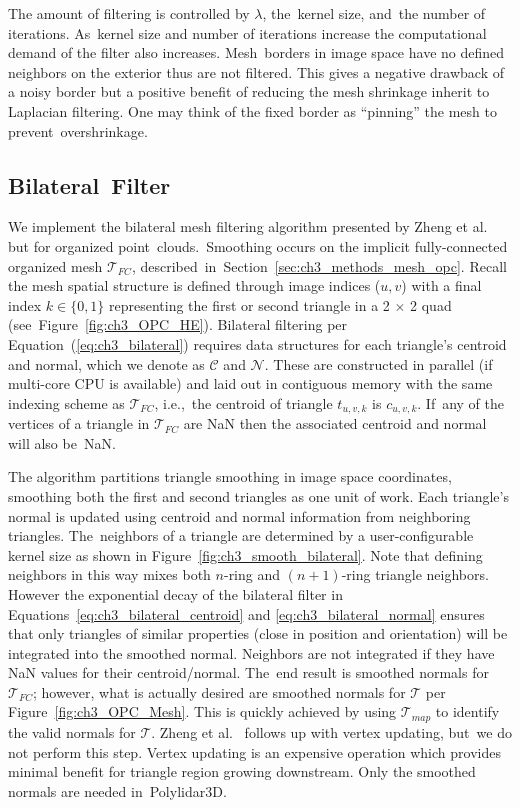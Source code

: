 The amount of filtering is controlled by $\lambda$, the~kernel size, and~the number of iterations. As~kernel size and number of iterations increase the computational demand of the filter also increases. Mesh~borders in image space have no defined neighbors on the exterior thus are not filtered. This gives a negative drawback of a noisy border but a positive benefit of reducing the mesh shrinkage inherit to Laplacian filtering. One may think of the fixed border as ``pinning'' the mesh to prevent~overshrinkage. 


\subsection{Bilateral~Filter}\label{sec:ch3_methods_mesh_smoothing_bilateral}

We implement the bilateral mesh filtering algorithm presented by Zheng et al.~\cite{zheng_bilateral_2011} but for organized point~clouds.~Smoothing occurs on the implicit fully-connected organized mesh $\mathcal{T}_{FC}$, described~in~Section~\ref{sec:ch3_methods_mesh_opc}.  Recall the mesh spatial structure is defined through image indices ($u,v$) with a final index $k \in \{0,1\}$ representing the first or second triangle in a 2 $\times$ 2 quad (see~Figure~\ref{fig:ch3_OPC_HE}). Bilateral filtering per Equation~(\ref{eq:ch3_bilateral}) requires data structures for each triangle's centroid and normal, which we denote as $\mathcal{C}$ and $\mathcal{N}$. These are constructed in parallel (if multi-core CPU is available) and laid out in contiguous memory with the same indexing scheme as $\mathcal{T}_{FC}$, i.e.,~the centroid of triangle $t_{u,v,k}$ is $c_{u,v,k}$. If~any of the vertices of a triangle in $\mathcal{T}_{FC}$  are NaN then the associated centroid and normal will also be~NaN.

The algorithm partitions triangle smoothing in image space coordinates, smoothing both the first and second triangles as one unit of work. Each triangle's normal is updated using centroid and normal information from neighboring triangles. The~neighbors of a triangle are determined by a user-configurable kernel size as shown in Figure~\ref{fig:ch3_smooth_bilateral}.  Note that defining neighbors in this way mixes both $n$-ring and $(n+1)$-ring triangle neighbors. However the exponential decay of the bilateral filter in Equations~\ref{eq:ch3_bilateral_centroid} and \ref{eq:ch3_bilateral_normal} ensures that only triangles of similar properties (close in position and orientation) will be integrated into the smoothed normal. Neighbors are not integrated if they have NaN values for their centroid/normal. The~end result is smoothed normals for $\mathcal{T}_{FC}$; however, what is actually desired are smoothed normals for $\mathcal{T}$ per Figure~\ref{fig:ch3_OPC_Mesh}. This is quickly achieved by using $\mathcal{T}_{map}$ to identify the valid normals for $\mathcal{T}$. Zheng et al.~\cite{zheng_bilateral_2011} follows up with vertex updating, but~we do not perform this step. Vertex updating is an expensive operation which provides minimal benefit for triangle region growing downstream. Only the smoothed normals are needed in~Polylidar3D. 


